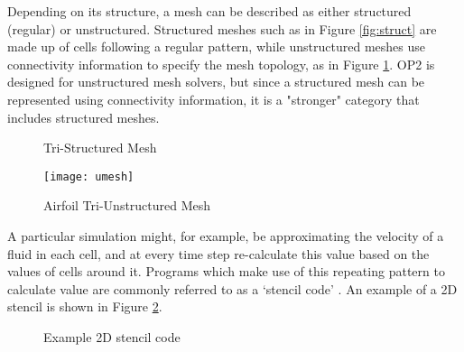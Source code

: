 \clearpage
\noindent Depending on its structure, a mesh can be described as either structured (regular) or unstructured. Structured meshes such as in Figure \ref{fig:struct} are made up of cells following a regular pattern, while unstructured meshes use connectivity information to specify the mesh topology, as in Figure \ref{fig:umesh}. OP2 is designed for unstructured mesh solvers, but since a structured mesh can be represented using connectivity information, it is a "stronger" category that includes structured meshes.
\vspace{.5cm}
\begin{figure}[h!]
  \begin{minipage}{.5\textwidth}
    \centering
    \caption{Tri-Structured Mesh}
    \label{fig:struct}
  \end{minipage}
  \begin{minipage}{.5\textwidth}
    \centering
    \texttt{[image: umesh]}
    \caption{Airfoil Tri-Unstructured Mesh}
    \label{fig:umesh}
  \end{minipage}
\end{figure}
\par
\noindent A particular simulation might, for example, be approximating the velocity of a fluid in each cell, and at every time step re-calculate this value based on the values of cells around it. Programs which make use of this repeating pattern to calculate value are commonly referred to as a `stencil code' \cite{stencil}. An example of a 2D stencil is shown in Figure \ref{fig:stencil}.
\vspace{.5cm}
\begin{figure}[h!]
  \centering
{}
\caption{Example 2D stencil code}
\label{fig:stencil}
\end{figure}

